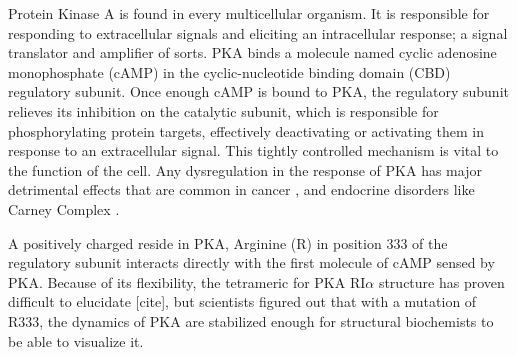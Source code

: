 \documentclass[12pt]{ucsddissertation}
\begin{document}
\begin{dissertationintroduction}
Protein Kinase A is found in every multicellular organism. It is responsible for responding to extracellular signals and eliciting an intracellular response; a signal translator and amplifier of sorts. PKA binds a molecule named cyclic adenosine monophosphate (cAMP) in the cyclic-nucleotide binding domain (CBD) regulatory subunit. Once enough cAMP is bound to PKA, the regulatory subunit relieves its inhibition on the catalytic subunit, which is responsible for phosphorylating protein targets, effectively deactivating or activating them in response to an extracellular signal. This tightly controlled mechanism is vital to the function of the cell. Any dysregulation in the response of PKA has major detrimental effects that are common in cancer \cite{Caretta2011}, and endocrine disorders like Carney Complex \cite{Horvath2010}.


A positively charged reside in PKA, Arginine (R) in position 333 of the regulatory subunit interacts directly with the first molecule of cAMP sensed by PKA. Because of its flexibility, the tetrameric for PKA RI$\alpha$ structure has proven difficult to elucidate [cite], but scientists figured out that with a mutation of R333, the dynamics of PKA are stabilized enough for structural biochemists to be able to visualize it.


\end{dissertationintroduction}
\end{document}
